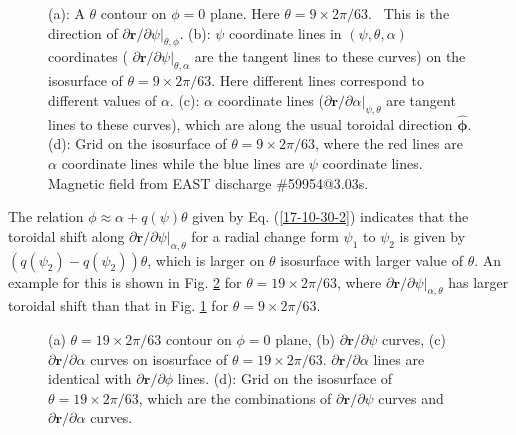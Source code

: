 \documentclass{llncs}
\newcommand{\nobracket}{}
\newcommand{\tmmathbf}[1]{\ensuremath{\boldsymbol{#1}}}
\begin{document}
\begin{figure}[h]
  
  \caption{\label{17-9-16-1}(a): A $\theta$ contour on $\phi = 0$ plane. Here
  $\theta = 9 \times 2 \pi / 63$. \ This is the direction of $\partial
  \mathbf{r}/ \partial \psi |_{\theta, \phi} \nobracket$. (b): $\psi$
  coordinate lines in $(\psi, \theta, \alpha)$ coordinates ( $\partial
  \mathbf{r}/ \partial \psi |_{\theta, \alpha} \nobracket$ are the tangent
  lines to these curves) on the isosurface of $\theta = 9 \times 2 \pi / 63$.
  Here different lines correspond to different values of $\alpha$. (c):
  $\alpha$ coordinate lines ($\partial \mathbf{r}/ \partial \alpha |_{\psi,
  \theta} \nobracket$ are tangent lines to these curves), which are along the
  usual toroidal direction $\hat{\tmmathbf{\phi}}$. (d): Grid on the
  isosurface of $\theta = 9 \times 2 \pi / 63$, where the red lines are
  $\alpha$ coordinate lines while the blue lines are $\psi$ coordinate lines.
  Magnetic field from EAST discharge \#59954@3.03s.}
\end{figure}

The relation $\phi \approx \alpha + q (\psi) \theta$ given by Eq.
(\ref{17-10-30-2}) indicates that the toroidal shift along $\partial
\mathbf{r}/ \partial \psi |_{\alpha, \theta} \nobracket$ for a radial change
form $\psi_1$ to $\psi_2$ is given by $(q (\psi_2) - q (\psi_2)) \theta$,
which is larger on $\theta$ isosurface with larger value of $\theta$. An
example for this is shown in Fig. \ref{17-10-30-5} for $\theta = 19 \times 2
\pi / 63$, where $\partial \mathbf{r}/ \partial \psi |_{\alpha, \theta}
\nobracket$ has larger toroidal shift than that in Fig. \ref{17-9-16-1} for
$\theta = 9 \times 2 \pi / 63$.

\begin{figure}[h]
  
  \caption{\label{17-10-30-5}(a) $\theta = 19 \times 2 \pi / 63$ contour on
  $\phi = 0$ plane, (b) $\partial \mathbf{r}/ \partial \psi$ curves, (c)
  $\partial \mathbf{r}/ \partial \alpha$ curves on isosurface of $\theta = 19
  \times 2 \pi / 63$. $\partial \mathbf{r}/ \partial \alpha$ lines are
  identical with $\partial \mathbf{r}/ \partial \phi$ lines. (d): Grid on the
  isosurface of $\theta = 19 \times 2 \pi / 63$, which are the combinations of
  $\partial \mathbf{r}/ \partial \psi$ curves and $\partial \mathbf{r}/
  \partial \alpha$ curves.}
\end{figure}
\end{document}
